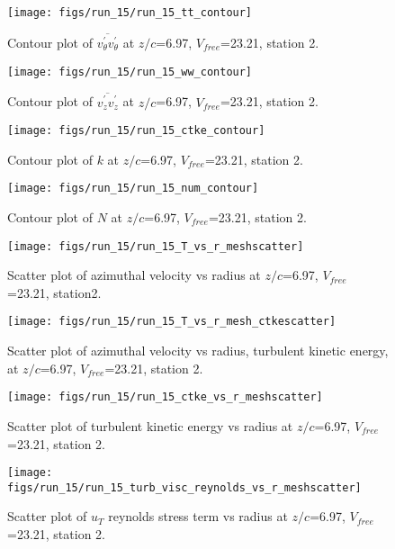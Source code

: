 \begin{figure}[H]
\centering
\texttt{[image: figs/run\_15/run\_15\_tt\_contour]}
\caption{Contour plot of $\overline{v_{\theta}^{\prime} v_{\theta}^{\prime}}$ at $z/c$=6.97, $V_{free}$=23.21, station 2.}
\end{figure}


\begin{figure}[H]
\centering
\texttt{[image: figs/run\_15/run\_15\_ww\_contour]}
\caption{Contour plot of $\overline{v_{z}^{\prime} v_{z}^{\prime}}$ at $z/c$=6.97, $V_{free}$=23.21, station 2.}
\end{figure}


\begin{figure}[H]
\centering
\texttt{[image: figs/run\_15/run\_15\_ctke\_contour]}
\caption{Contour plot of $k$ at $z/c$=6.97, $V_{free}$=23.21, station 2.}
\end{figure}


\begin{figure}[H]
\centering
\texttt{[image: figs/run\_15/run\_15\_num\_contour]}
\caption{Contour plot of $N$ at $z/c$=6.97, $V_{free}$=23.21, station 2.}
\end{figure}


\begin{figure}[H]
\centering
\texttt{[image: figs/run\_15/run\_15\_T\_vs\_r\_meshscatter]}
\caption{Scatter plot of azimuthal velocity vs radius at $z/c$=6.97, $V_{free}$=23.21, station2.}
\end{figure}


\begin{figure}[H]
\centering
\texttt{[image: figs/run\_15/run\_15\_T\_vs\_r\_mesh\_ctkescatter]}
\caption{Scatter plot of azimuthal velocity vs radius, turbulent kinetic energy, at $z/c$=6.97, $V_{free}$=23.21, station 2.}
\end{figure}


\begin{figure}[H]
\centering
\texttt{[image: figs/run\_15/run\_15\_ctke\_vs\_r\_meshscatter]}
\caption{Scatter plot of turbulent kinetic energy vs radius at $z/c$=6.97, $V_{free}$=23.21, station 2.}
\end{figure}


\begin{figure}[H]
\centering
\texttt{[image: figs/run\_15/run\_15\_turb\_visc\_reynolds\_vs\_r\_meshscatter]}
\caption{Scatter plot of $
u_T$ reynolds stress term vs radius at $z/c$=6.97, $V_{free}$=23.21, station 2.}
\end{figure}


